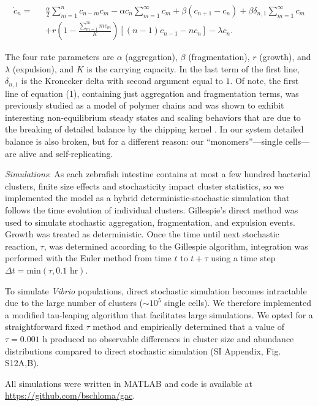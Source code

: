 \documentclass[12pt]{article}
\begin{document}
\begin{align}
\dot{c}_n = \text{ }& \frac{\alpha}{2}\sum_{m=1}^{n} c_{n-m}c_m - \alpha c_n \sum_{m=1}^{\infty}c_m+\beta(c_{n+1}- c_n) + \beta\delta_{n,1}\sum_{m=1}^{\infty}c_m\nonumber\\[6pt]
&+r\left(1-\frac{\sum_{m=1}^{\infty}mc_m}{K}\right)\left[(n-1)c_{n-1} - nc_n\right]  - \lambda c_n. 
\end{align}

\noindent The four rate parameters are $\alpha$ (aggregation), $\beta$ (fragmentation), $r$ (growth), and $\lambda$ (expulsion), and $K$ is the carrying capacity. In the last term of the first line,  $\delta_{n,1}$ is the Kronecker delta with second argument equal to $1$. Of note, the first line of equation (1), containing just aggregation and fragmentation terms, was previously studied as a model of polymer chains and was shown to exhibit interesting non-equilibrium steady states and scaling behaviors that are due to the breaking of detailed balance by the chipping kernel \cite{krapivsky1996transitional}. In our system detailed balance is also broken, but for a different reason: our ``monomers''---single cells---are alive and self-replicating.

\textit{Simulations}: As each zebrafish intestine contains at most a few hundred bacterial clusters, finite size effects and stochasticity impact cluster statistics, so we implemented the model as a hybrid deterministic-stochastic simulation that follows the time evolution of individual clusters. Gillespie's direct method \cite{gillespie1977exact} was used to simulate stochastic aggregation, fragmentation, and expulsion events. Growth was treated as deterministic. Once the time until next stochastic reaction, $\tau$, was determined according to the Gillespie algorithm, integration was performed with the Euler method from time $t$ to $t+\tau$ using a time step $\Delta t = \text{min}(\tau, 0.1 \text{ hr})$. 

To simulate \textit{Vibrio} populations, direct stochastic simulation becomes intractable due to the large number of clusters ($\sim 10^5$ single cells). We therefore implemented a modified tau-leaping algorithm \cite{gillespie2001approximate} that facilitates large simulations. We opted for a straightforward fixed $\tau$ method and empirically determined that a value of $\tau = 0.001$ h produced no observable differences in cluster size and abundance distributions compared to direct stochastic simulation (SI Appendix, Fig. S12A,B).

All simulations were written in MATLAB and code is available at \url{https://github.com/bschloma/gac}.
\end{document}
